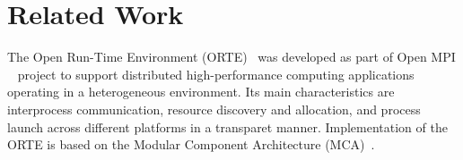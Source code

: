 \chapter{Related Work}
\label{sec:Related Work}

The Open Run-Time Environment (ORTE)~\cite{Castain2008153} was developed as part of Open MPI
~\cite{gabriel04:_open_mpi} project to support distributed high-performance computing
applications operating in a heterogeneous environment. Its main 
characteristics are interprocess communication, resource discovery and
allocation, and process launch across different platforms in a transparet manner.
Implementation of the ORTE is based on the Modular Component Architecture 
(MCA)~\cite{gabriel04:_open_mpi}.

